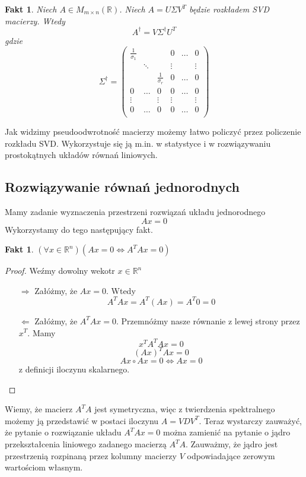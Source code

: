 \documentclass{article}
\newtheorem{fact}[theorem]{Fakt}
\theoremstyle{definition}
\begin{document}
\begin{fact}
Niech $A \in M_{m \times n} (\mathbb{R})$. Niech $A = U \Sigma V^T$ będzie rozkładem SVD macierzy. Wtedy
$$ A^\dag = V \Sigma^\dag U^T $$
gdzie
$$ \Sigma^\dag = \begin{pmatrix}
\frac{1}{\sigma_1} &  & & 0 & \ldots & 0 \\
 & \ddots & & \vdots & & \vdots \\
 & & \frac{1}{\sigma_r} & 0 & \ldots & 0 \\
0 & \ldots & 0 & 0 & \ldots & 0 \\
\vdots & & \vdots & \vdots & & \vdots \\
0 & \ldots & 0 & 0 & \ldots & 0 \\
\end{pmatrix} $$
\end{fact}

Jak widzimy pseudoodwrotność macierzy możemy łatwo policzyć przez policzenie rozkładu SVD. Wykorzystuje się ją m.in. w statystyce i w rozwiązywaniu prostokątnych układów równań liniowych.

\subsection{Rozwiązywanie równań jednorodnych}
Mamy zadanie wyznaczenia przestrzeni rozwiązań układu jednorodnego
$$Ax = 0$$
Wykorzystamy do tego następujący fakt.
\begin{fact}
 $(\forall x \in \mathbb{R} ^n) (Ax=0 \Leftrightarrow A^TAx=0) $
\end{fact}
\begin{proof}Weźmy dowolny wekotr $x \in \mathbb{R}^n$
\begin{itemize}
    \item[$\Rightarrow$] Załóżmy, że $Ax=0$. Wtedy $$A^TAx = A^T(Ax) = A^T 0 = 0 $$ 
    \item[$\Leftarrow$] Załóżmy, że $A^TAx=0$. Przemnóżmy nasze równanie z lewej strony przez $x^T$. Mamy
    $$ x^TA^TAx = 0 $$
    $$ (Ax)^TAx = 0 $$
    $$ Ax \circ Ax = 0 \Leftrightarrow Ax = 0 $$
    z definicji iloczynu skalarnego.
\end{itemize}
\end{proof}
Wiemy, że macierz $A^TA$ jest symetryczna, więc z twierdzenia spektralnego możemy ją przedstawić w postaci iloczynu $A = VDV^T$. Teraz wystarczy zauważyć, że pytanie o rozwiązanie układu $A^TAx =0$ można zamienić na pytanie o jądro przekształcenia liniowego zadanego macierzą $A^TA$. Zauważmy, że jądro jest przestrzenią rozpinaną przez kolumny macierzy $V$ odpowiadające zerowym wartościom własnym.
\end{document}
